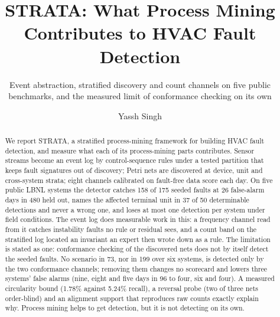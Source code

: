\documentclass[runningheads]{llncs}
\begin{document}
\title{STRATA: What Process Mining Contributes to HVAC Fault Detection}
\subtitle{Event abstraction, stratified discovery and count channels on five
public benchmarks, and the measured limit of conformance checking on its own}

\author{Yassh Singh}

\maketitle

\begin{abstract}
We report STRATA, a stratified process-mining framework for building HVAC
fault detection, and measure what each of its process-mining parts
contributes. Sensor streams become an event log by control-sequence rules
under a tested partition that keeps fault signatures out of discovery; Petri
nets are discovered at device, unit and cross-system strata; eight channels
calibrated on fault-free data score each day. On five public LBNL systems the
detector catches 158 of 175 seeded faults at 26 false-alarm days in 480 held
out, names the affected terminal unit in 37 of 50 determinable detections and
never a wrong one, and loses at most one detection per system under field
conditions. The event log does measurable work in this: a frequency channel
read from it catches instability faults no rule or residual sees, and a count band on the
stratified log located an invariant an expert then wrote down as a rule. The
limitation is stated as one: conformance checking of the discovered nets does
not by itself detect the seeded faults. No scenario in 73, nor in 199 over six
systems, is detected only by the two conformance channels; removing them
changes no scorecard and lowers three systems' false alarms (nine, eight and
five days in 96 to four, six and four). A measured circularity bound (1.78\% against 5.24\% recall), a
reversal probe (two of three nets order-blind) and an alignment support that
reproduces raw counts exactly explain why. Process mining helps to get
detection, but it is not detecting on its own.

\end{abstract}
\end{document}
